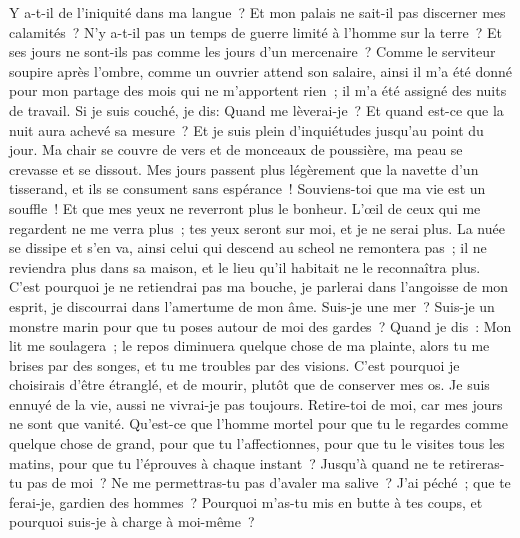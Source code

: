 \begin{multicols}{2}
Y a-t-il de l'iniquité dans ma langue~? Et mon palais ne sait-il pas discerner mes calamités~?
\VerseOne{}N'y a-t-il pas un temps de guerre limité à l'homme sur la terre~? Et ses jours ne sont-ils pas comme les jours d'un mercenaire~?
Comme le serviteur soupire après l'ombre, comme un ouvrier attend son salaire,
ainsi il m'a été donné pour mon partage des mois qui ne m'apportent rien~; il m'a été assigné des nuits de travail.
Si je suis couché, je dis: Quand me lèverai-je~? Et quand est-ce que la nuit aura achevé sa mesure~? Et je suis plein d'inquiétudes jusqu'au point du jour.
Ma chair se couvre de vers et de monceaux de poussière, ma peau se crevasse et se dissout.
Mes jours passent plus légèrement que la navette d'un tisserand, et ils se consument sans espérance~!
Souviens-toi que ma vie est un souffle~! Et que mes yeux ne reverront plus le bonheur.
L'œil de ceux qui me regardent ne me verra plus~; tes yeux seront sur moi, et je ne serai plus.
La nuée se dissipe et s'en va, ainsi celui qui descend au scheol ne remontera pas~;
il ne reviendra plus dans sa maison, et le lieu qu'il habitait ne le reconnaîtra plus.
C'est pourquoi je ne retiendrai pas ma bouche, je parlerai dans l'angoisse de mon esprit, je discourrai dans l'amertume de mon âme.
Suis-je une mer~? Suis-je un monstre marin pour que tu poses autour de moi des gardes~?
Quand je dis~: Mon lit me soulagera~; le repos diminuera quelque chose de ma plainte,
alors tu me brises par des songes, et tu me troubles par des visions.
C'est pourquoi je choisirais d'être étranglé, et de mourir, plutôt que de conserver mes os.
Je suis ennuyé de la vie, aussi ne vivrai-je pas toujours. Retire-toi de moi, car mes jours ne sont que vanité.
Qu'est-ce que l'homme mortel pour que tu le regardes comme quelque chose de grand, pour que tu l'affectionnes,
pour que tu le visites tous les matins, pour que tu l'éprouves à chaque instant~?
Jusqu'à quand ne te retireras-tu pas de moi~? Ne me permettras-tu pas d'avaler ma salive~?
J'ai péché~; que te ferai-je, gardien des hommes~? Pourquoi m'as-tu mis en butte à tes coups, et pourquoi suis-je à charge à moi-même~?

\end{multicols}
